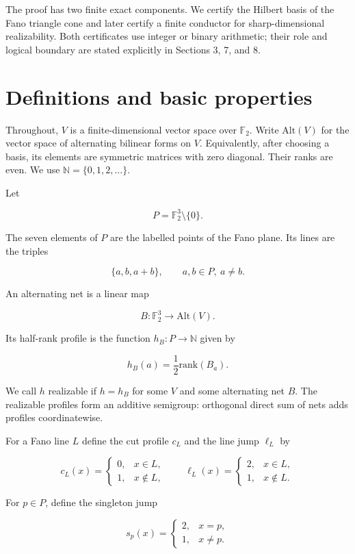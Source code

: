 \documentclass[11pt]{article}
\theoremstyle{remark}
\numberwithin{equation}{section}
\begin{document}
The proof has two finite exact components. We certify the Hilbert basis of the
Fano triangle cone and later certify a finite conductor for sharp-dimensional
realizability. Both certificates use integer or binary arithmetic; their role
and logical boundary are stated explicitly in Sections 3, 7, and 8.

\section{Definitions and basic properties}


Throughout, $V$ is a finite-dimensional vector space over $\mathbb F_2$.
Write $\mathrm{Alt}(V)$ for the vector space of alternating bilinear forms on
$V$. Equivalently, after choosing a basis, its elements are symmetric matrices
with zero diagonal. Their ranks are even. We use
$\mathbb N=\{0,1,2,\ldots\}$.

Let

\nopagebreak[4]
\[
P=\mathbb F_2^3\setminus\{0\}.
\]

The seven elements of $P$ are the labelled points of the Fano plane. Its lines
are the triples

\nopagebreak[4]
\[
\{a,b,a+b\},\qquad a,b\in P,\ a\ne b.
\]

An alternating net is a linear map

\nopagebreak[4]
\[
B:\mathbb F_2^3\longrightarrow\mathrm{Alt}(V).
\]

Its half-rank profile is the function $h_B:P\to\mathbb N$ given by

\nopagebreak[4]
\[
h_B(a)=\frac{1}{2}\mathrm{rank}(B_a).
\tag{2.1}
\]

We call $h$ realizable if $h=h_B$ for some $V$ and some alternating net $B$.
The realizable profiles form an additive semigroup: orthogonal direct sum of
nets adds profiles coordinatewise.

For a Fano line $L$ define the cut profile $c_L$ and the line jump $\ell_L$ by

\nopagebreak[4]
\[
c_L(x)=
\begin{cases}
0,&x\in L,\\
1,&x\notin L,
\end{cases}
\qquad
\ell_L(x)=
\begin{cases}
2,&x\in L,\\
1,&x\notin L.
\end{cases}
\tag{2.2}
\]

For $p\in P$, define the singleton jump

\nopagebreak[4]
\[
s_p(x)=
\begin{cases}
2,&x=p,\\
1,&x\ne p.
\end{cases}
\tag{2.3}
\]
\end{document}
